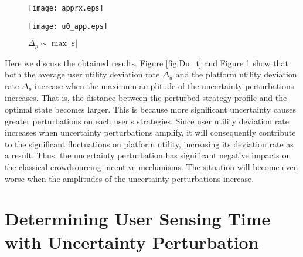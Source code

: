\documentclass{IEEEtran}
\begin{document}
\begin{figure}[!t]
	\begin{minipage}[b]{0.49\linewidth}
	\centering
	\texttt{[image: apprx.eps]}
	\caption{$\Delta_u \sim \max{|\varepsilon|}$}
	\label{fig:Du_t}
	\end{minipage}
	\hfill
	\begin{minipage}[b]{0.49\linewidth}
	\centering
	\texttt{[image: u0\_app.eps]}
	\caption{$\Delta_p \sim \max{|\varepsilon|}$}
	\label{fig:Dp_t}
	\end{minipage}
\end{figure}

{\color{black}
Here we discuss the obtained results. Figure \ref{fig:Du_t} and Figure \ref{fig:Dp_t} show that both the average user utility deviation rate $\Delta_u$ and the platform utility deviation rate $\Delta_p$ increase when the maximum amplitude of the uncertainty perturbations increases. That is, the distance between the perturbed strategy profile and the optimal state becomes larger. This is because more significant uncertainty causes greater perturbations on each user's strategies. Since user utility deviation rate increases when uncertainty perturbations amplify, it will consequently contribute to the significant fluctuations on platform utility, increasing its deviation rate as a result. 
Thus, the uncertainty perturbation has significant negative impacts on the classical crowdsourcing incentive mechanisms. The situation will become even worse when the amplitudes of the uncertainty perturbations increase.
}

\section{Determining User Sensing Time with Uncertainty Perturbation}
\label{sec:sensing_determine}
\end{document}
